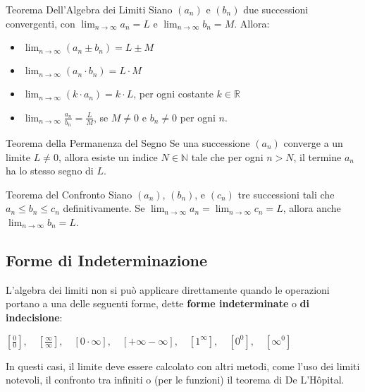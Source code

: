 \documentclass{article}
\begin{document}
\begin{theorem}{Teorema Dell'Algebra dei Limiti}{}
    Siano $(a_n)$ e $(b_n)$ due successioni convergenti, con $\lim_{n \to \infty} a_n = L$ e $\lim_{n \to \infty} b_n = M$. Allora:
    \begin{itemize}
        \item $\lim_{n \to \infty} (a_n \pm b_n) = L \pm M$
        \item $\lim_{n \to \infty} (a_n \cdot b_n) = L \cdot M$
        \item $\lim_{n \to \infty} (k \cdot a_n) = k \cdot L$, per ogni costante $k \in \mathbb{R}$
        \item $\lim_{n \to \infty} \frac{a_n}{b_n} = \frac{L}{M}$, se $M \neq 0$ e $b_n \neq 0$ per ogni $n$.
    \end{itemize}
\end{theorem}

\begin{theorem}{Teorema della Permanenza del Segno}{}
    Se una successione $(a_n)$ converge a un limite $L \neq 0$, allora esiste un indice $N \in \mathbb{N}$ tale che per ogni $n > N$, il termine $a_n$ ha lo stesso segno di $L$.
\end{theorem}

\begin{theorem}{Teorema del Confronto}{}
    Siano $(a_n)$, $(b_n)$, e $(c_n)$ tre successioni tali che $a_n \le b_n \le c_n$ definitivamente. Se $\lim_{n \to \infty} a_n = \lim_{n \to \infty} c_n = L$, allora anche $\lim_{n \to \infty} b_n = L$.
\end{theorem}

\subsection{Forme di Indeterminazione}
L'algebra dei limiti non si può applicare direttamente quando le operazioni portano a una delle seguenti forme, dette \textbf{forme indeterminate} o \textbf{di indecisione}:
\begin{center}
    $ \left[ \frac{0}{0} \right], \quad \left[ \frac{\infty}{\infty} \right], \quad [0 \cdot \infty], \quad [+\infty - \infty], \quad [1^\infty], \quad [0^0], \quad [\infty^0] $
\end{center}
In questi casi, il limite deve essere calcolato con altri metodi, come l'uso dei limiti notevoli, il confronto tra infiniti o (per le funzioni) il teorema di De L'Hôpital.
\end{document}
